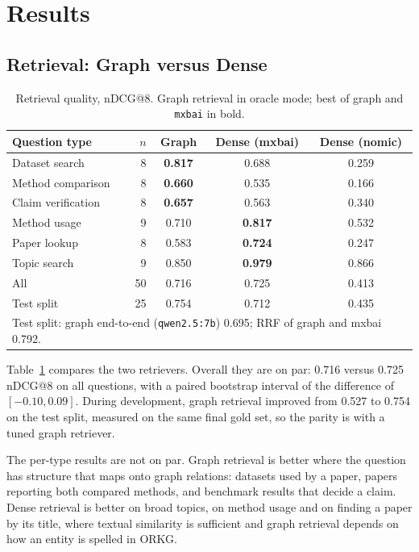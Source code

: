 
\section{Results}
\label{sec:results}

\subsection{Retrieval: Graph versus Dense}

\begin{table}[t]
\caption{Retrieval quality, nDCG@8. Graph retrieval in oracle mode; best of graph and \texttt{mxbai} in bold.}
\label{tab:retrieval}
\centering
\setlength{\tabcolsep}{4pt}
\begin{tabular}{lrccc}
\hline
Question type & $n$ & Graph & Dense (mxbai) & Dense (nomic) \\
\hline
Dataset search       & 8 & \textbf{0.817} & 0.688 & 0.259 \\
Method comparison    & 8 & \textbf{0.660} & 0.535 & 0.166 \\
Claim verification   & 8 & \textbf{0.657} & 0.563 & 0.340 \\
Method usage         & 9 & 0.710 & \textbf{0.817} & 0.532 \\
Paper lookup         & 8 & 0.583 & \textbf{0.724} & 0.247 \\
Topic search         & 9 & 0.850 & \textbf{0.979} & 0.866 \\
\hline
All                  & 50 & 0.716 & 0.725 & 0.413 \\
Test split           & 25 & 0.754 & 0.712 & 0.435 \\
\hline
\multicolumn{5}{p{0.93\columnwidth}}{\footnotesize Test split: graph end-to-end (\texttt{qwen2.5:7b}) 0.695; RRF of graph and mxbai 0.792.}
\end{tabular}
\end{table}

Table~\ref{tab:retrieval} compares the two retrievers. Overall they are on par:
0.716 versus 0.725 nDCG@8 on all questions, with a paired bootstrap interval of
the difference of $[-0.10, 0.09]$. During development, graph retrieval improved
from 0.527 to 0.754 on the test split, measured on the same final gold set, so
the parity is with a tuned graph retriever.

The per-type results are not on par. Graph retrieval is better where the
question has structure that maps onto graph relations: datasets used by a
paper, papers reporting both compared methods, and benchmark results that
decide a claim. Dense retrieval is better on broad topics, on method usage and on finding a
paper by its title, where textual similarity is sufficient and graph retrieval
depends on how an entity is spelled in ORKG.

